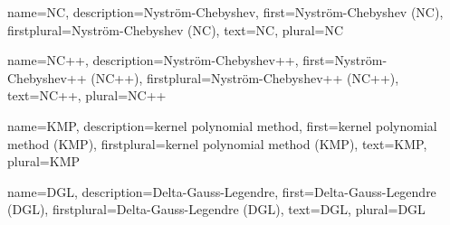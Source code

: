 {%
  name={NC},%
  description={Nystr\"om-Chebyshev},%
  first={Nystr\"om-Chebyshev (NC)},%
  firstplural={Nystr\"om-Chebyshev (NC)},%
  text={NC},%
  plural={NC}%
}

{%
  name={NC++},%
  description={Nystr\"om-Chebyshev++},%
  first={Nystr\"om-Chebyshev++ (NC++)},%
  firstplural={Nystr\"om-Chebyshev++ (NC++)},%
  text={NC++},%
  plural={NC++}%
}

{%
  name={KMP},%
  description={kernel polynomial method},%
  first={kernel polynomial method (KMP)},%
  firstplural={kernel polynomial method (KMP)},%
  text={KMP},%
  plural={KMP}%
}

{%
  name={DGL},%
  description={Delta-Gauss-Legendre},%
  first={Delta-Gauss-Legendre (DGL)},%
  firstplural={Delta-Gauss-Legendre (DGL)},%
  text={DGL},%
  plural={DGL}%
}
